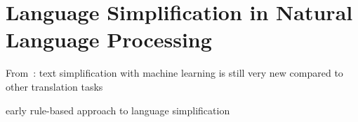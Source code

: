 %

%
%
%

%
%
%
%
%
%
%
%
%
%
%
%
%
%
%
%
%
%
%
%
%
%
%
%
%
%
%
%
%
%
%
%
%
%
%
%

\section{Language Simplification in Natural Language Processing}\label{sec:langSimp}


From~\autocite{schomacker2023data}:
text simplification with machine learning is still very new compared to other translation tasks



early rule-based approach to language simplification~\autocite{suter2016}







